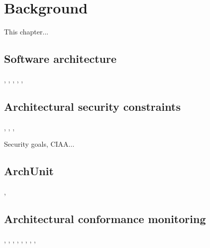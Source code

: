 \chapter{Background}

This chapter...

\section{Software architecture}
\cite{ambriola_introduction_1993}, \cite{jansen_software_2005}, \cite{bass_software_2013}, \cite{scandariato_architecting_2009}, \cite{nguyen_sospa_2015}, 

\section{Architectural security constraints}
\cite{broy_software_2007}, \cite{felderer_security_2016}, \cite{haley_security_2008}, 

Security goals, CIAA...

\section{ArchUnit}\label{archunit-back-section}
,
\section{Architectural conformance monitoring}
\cite{aldrich_archjava_2002}, \cite{abi-antoun_analyzing_2010}, \cite{luckham_event-based_1995}, \cite{abi-antoun_static_2009}, \cite{de_silva_controlling_2012}, \cite{knodel_comparison_2007}, \cite{jansen_documenting_2008}, \cite{hong_yan_discotect_2004}, 



